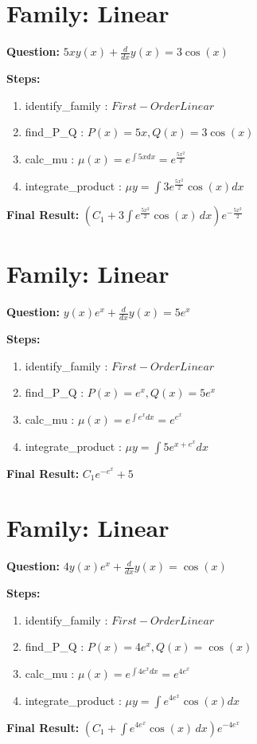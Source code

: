 \documentclass{article}
\begin{document}
\section*{Family: Linear}
\textbf{Question:} $5 x y{\left(x \right)} + \frac{d}{d x} y{\left(x \right)} = 3 \cos{\left(x \right)}$

\textbf{Steps:}
\begin{enumerate}
\item identify_family :  $First-Order Linear$
\item find_P_Q :  $P(x)=5 x, Q(x)=3 \cos{\left(x \right)}$
\item calc_mu :  $\mu(x) = e^{\int 5 x dx} = e^{\frac{5 x^{2}}{2}}$
\item integrate_product :  $\mu y = \int 3 e^{\frac{5 x^{2}}{2}} \cos{\left(x \right)} dx$
\end{enumerate}
\textbf{Final Result:} $\left(C_{1} + 3 \int e^{\frac{5 x^{2}}{2}} \cos{\left(x \right)}\, dx\right) e^{- \frac{5 x^{2}}{2}}$

\section*{Family: Linear}
\textbf{Question:} $y{\left(x \right)} e^{x} + \frac{d}{d x} y{\left(x \right)} = 5 e^{x}$

\textbf{Steps:}
\begin{enumerate}
\item identify_family :  $First-Order Linear$
\item find_P_Q :  $P(x)=e^{x}, Q(x)=5 e^{x}$
\item calc_mu :  $\mu(x) = e^{\int e^{x} dx} = e^{e^{x}}$
\item integrate_product :  $\mu y = \int 5 e^{x + e^{x}} dx$
\end{enumerate}
\textbf{Final Result:} $C_{1} e^{- e^{x}} + 5$

\section*{Family: Linear}
\textbf{Question:} $4 y{\left(x \right)} e^{x} + \frac{d}{d x} y{\left(x \right)} = \cos{\left(x \right)}$

\textbf{Steps:}
\begin{enumerate}
\item identify_family :  $First-Order Linear$
\item find_P_Q :  $P(x)=4 e^{x}, Q(x)=\cos{\left(x \right)}$
\item calc_mu :  $\mu(x) = e^{\int 4 e^{x} dx} = e^{4 e^{x}}$
\item integrate_product :  $\mu y = \int e^{4 e^{x}} \cos{\left(x \right)} dx$
\end{enumerate}
\textbf{Final Result:} $\left(C_{1} + \int e^{4 e^{x}} \cos{\left(x \right)}\, dx\right) e^{- 4 e^{x}}$
\end{document}
